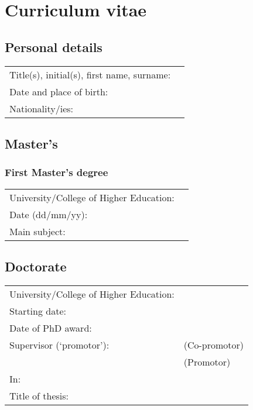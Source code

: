 \section{Curriculum vitae}

\subsection{Personal details}

\begin{table}[h!]
\flushleft
\small
\begin{tabular}{p{19em}p{25em}}
\T\B Title(s), initial(s), first name, surname:& \\

\T\B Date and place of birth:&\\

\T\B Nationality/ies:&\\

\end{tabular}
\end{table}

\subsection{Master's}

\subsubsection*{First Master's degree}
\begin{table}[h!]
\flushleft
\small
\begin{tabular}{p{19em}p{25em}}
\T\B University/College of Higher Education:&\\
\T\B Date (dd/mm/yy):&\\
\T\B Main subject:&\\

\end{tabular}
\end{table}

\subsection{Doctorate}

\begin{table}[h!]
\flushleft
\small
\begin{tabular}{p{19em}p{25em}}
\T University/College of Higher Education:&\\
\T Starting date: &\\
\T Date of PhD award:&\\
\T Supervisor (`promotor'):& (Co-promotor)\\
&(Promotor)\\
\T In:& \\
\T Title of thesis:&\\

\end{tabular}
\end{table}


